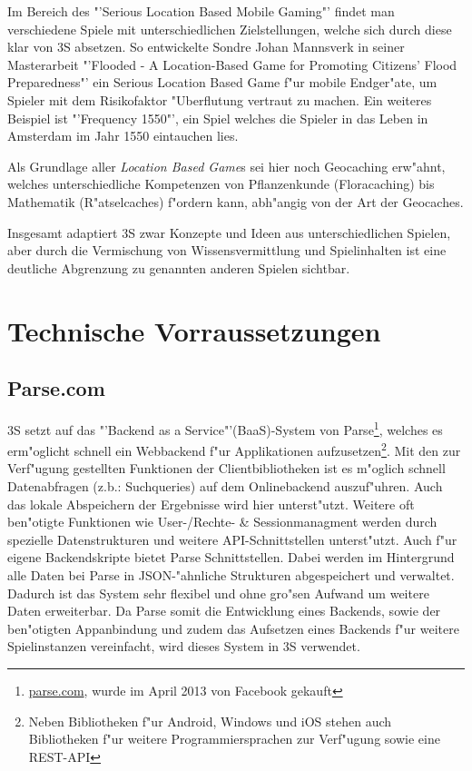 \documentclass{article}
\begin{document}
Im Bereich des "'Serious Location Based Mobile Gaming"' findet man verschiedene Spiele mit unterschiedlichen Zielstellungen, welche sich durch diese klar von 3S absetzen. So entwickelte Sondre Johan Mannsverk in seiner Masterarbeit "'Flooded - A Location-Based Game for Promoting Citizens' Flood Preparedness"'\cite{mannsverk2013flooded} ein Serious Location Based Game f"ur mobile Endger"ate, um Spieler mit dem Risikofaktor "Uberflutung vertraut zu machen. Ein weiteres Beispiel ist "'Frequency 1550"'\cite{huizenga2009mobile}, ein Spiel welches die Spieler in das Leben in Amsterdam im Jahr 1550 eintauchen lies.

Als Grundlage aller \textit{Location Based Game}s sei hier noch Geocaching erw"ahnt, welches unterschiedliche Kompetenzen von Pflanzenkunde (Floracaching) bis Mathematik (R"atselcaches) f"ordern kann, abh"angig von der Art der Geocaches.

Insgesamt adaptiert 3S zwar Konzepte und Ideen aus unterschiedlichen Spielen, aber durch die Vermischung von Wissensvermittlung und Spielinhalten ist eine deutliche Abgrenzung zu genannten anderen Spielen sichtbar.

\section{Technische Vorraussetzungen}
\label{subsec:technische_vorraussetzungen}

\subsection{Parse.com}
\label{subsubsec:parse}
3S setzt auf das "'Backend as a Service"'(BaaS)-System von Parse\footnote{\url{parse.com}, wurde im April 2013 von Facebook gekauft}, welches es erm"oglicht schnell ein Webbackend f"ur Applikationen aufzusetzen\footnote{Neben Bibliotheken f"ur Android, Windows und iOS stehen auch Bibliotheken f"ur weitere Programmiersprachen zur Verf"ugung sowie eine REST-API}. Mit den zur Verf"ugung gestellten Funktionen der Clientbibliotheken ist es m"oglich schnell Datenabfragen (z.b.: Suchqueries) auf dem Onlinebackend auszuf"uhren. Auch das lokale Abspeichern der Ergebnisse wird hier unterst"utzt. Weitere oft ben"otigte Funktionen wie User-/Rechte- \& Sessionmanagment werden durch spezielle Datenstrukturen und weitere API-Schnittstellen unterst"utzt. Auch f"ur eigene Backendskripte bietet Parse Schnittstellen. Dabei werden im Hintergrund alle Daten bei Parse in JSON-"ahnliche Strukturen abgespeichert und verwaltet. Dadurch ist das System sehr flexibel und ohne gro"sen Aufwand um weitere Daten erweiterbar. Da Parse somit die Entwicklung eines Backends, sowie der ben"otigten Appanbindung und zudem das Aufsetzen eines Backends f"ur weitere Spielinstanzen vereinfacht, wird dieses System in 3S verwendet.
\end{document}

